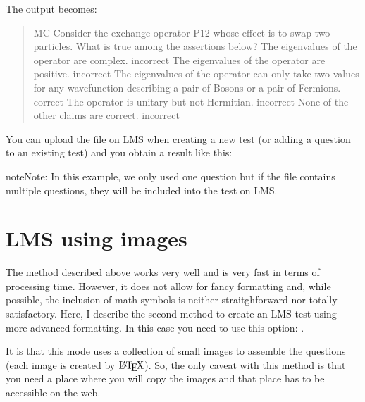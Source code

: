 \documentclass[letterpaper,10pt,english]{sphinxmanual}
\let\sphinxpxdimen\pdfpxdimen\else\newdimen\sphinxpxdimen
\begin{document}
The output becomes:
\begin{quote}

\begin{sphinxVerbatim}[commandchars=\\\{\}]
MC Consider the exchange operator P12 whose effect is
 to swap two particles. What is true among the assertions below?
 The eigenvalues of the operator are complex.  incorrect The
 eigenvalues of the operator are positive.  incorrect The
 eigenvalues of the operator can only take two values for any
 wavefunction describing a pair of Bosons or a pair of Fermions.
 correct The operator is unitary but not Hermitian.  incorrect
 None of the other claims are correct.  incorrect
\end{sphinxVerbatim}
\end{quote}

You can upload the file  on LMS when creating a new test (or adding a question to an existing test) and you obtain a result like this:

\noindent\sphinxincludegraphics[width=800\sphinxpxdimen]{{LMS_text_export}.png}

\begin{sphinxadmonition}{note}{Note:}
In this example, we only used one question but if the  file contains multiple questions, they will be included into the test on LMS.
\end{sphinxadmonition}


\section{LMS using images}
\label{\detokenize{lms:lms-using-images}}
The method described above works very well and is very fast in terms of processing time.
However, it does not allow for fancy formatting and, while possible, the inclusion of math symbols is neither straitghforward nor totally satisfactory.
Here, I describe the second method to create an LMS test using more advanced formatting. In this case you need to use this option: .

It is  that this mode uses a collection of small images to assemble the questions (each image is created by \(\textrm{\LaTeX}\)). So, the only caveat with this method is that you need a place where you will copy the images and that place has to be accessible on the web.
\end{document}
